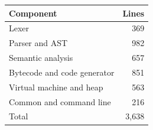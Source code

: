 \begin{tabular}{lr}
\toprule
Component & Lines \\
\midrule
Lexer & 369 \\
Parser and AST & 982 \\
Semantic analysis & 657 \\
Bytecode and code generator & 851 \\
Virtual machine and heap & 563 \\
Common and command line & 216 \\
\midrule
Total & 3{,}638 \\
\bottomrule
\end{tabular}
